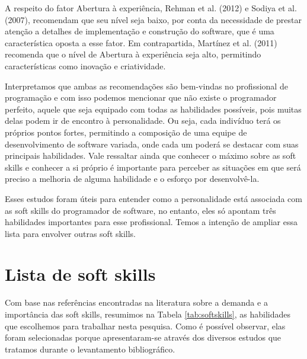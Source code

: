A respeito do fator Abertura à experiência, Rehman et al. (2012)\nocite{rehman:12} e Sodiya et al. (2007)\nocite{sodiya:07}, recomendam que seu nível seja baixo, por conta da necessidade de prestar atenção a detalhes de implementação e construção do software, que é uma característica oposta a esse fator. Em contrapartida, Martínez et al. (2011)\nocite{martinez:11} recomenda que o nível de Abertura à experiência seja alto, permitindo características como inovação e criatividade.

Interpretamos que ambas as recomendações são bem-vindas no profissional de programação e com isso podemos mencionar que não existe o programador perfeito, aquele que seja equipado com todas as habilidades possíveis, pois muitas delas podem ir de encontro à personalidade. Ou seja, cada indivíduo terá os próprios pontos fortes, permitindo a composição de uma equipe de desenvolvimento de software variada, onde cada um poderá se destacar com suas principais habilidades. Vale ressaltar ainda que conhecer o máximo sobre as soft skills e conhecer a si próprio é importante para perceber as situações em que será preciso a melhoria de alguma habilidade e o esforço por desenvolvê-la.

Esses estudos foram úteis para entender como a personalidade está associada com as soft skills do programador de software, no entanto, eles só apontam três habilidades importantes para esse profissional. Temos a intenção de ampliar essa lista para envolver outras soft skills.

\section{Lista de soft skills}
\label{sec:lista-ss}

Com base nas referências encontradas na literatura sobre a demanda e a importância das soft skills, resumimos na Tabela \ref{tab:softskills}, as habilidades que escolhemos para trabalhar nesta pesquisa. Como é possível observar, elas foram selecionadas porque apresentaram-se através dos diversos estudos que tratamos durante o levantamento bibliográfico.

